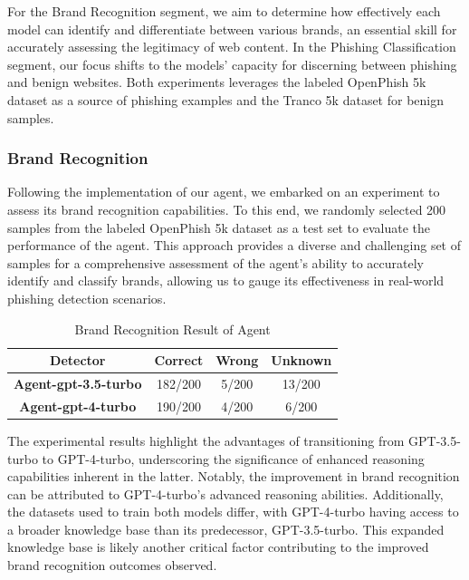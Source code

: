 For the Brand Recognition segment, we aim to determine how effectively each model can identify and differentiate between various brands, an essential skill for accurately assessing the legitimacy of web content. In the Phishing Classification segment, our focus shifts to the models' capacity for discerning between phishing and benign websites. Both experiments leverages the labeled OpenPhish 5k dataset as a source of phishing examples and the Tranco 5k dataset for benign samples.\cite{li2024knowphish}

\subsubsection{Brand Recognition}

Following the implementation of our agent, we embarked on an experiment to assess its brand recognition capabilities. To this end, we randomly selected 200 samples from the labeled OpenPhish 5k dataset as a test set to evaluate the performance of the agent. This approach provides a diverse and challenging set of samples for a comprehensive assessment of the agent's ability to accurately identify and classify brands, allowing us to gauge its effectiveness in real-world phishing detection scenarios.

\begin{table}[h!]
    \centering
    \begin{tabular}{cccc}
     \textbf{Detector} & \textbf{Correct} & \textbf{Wrong} & \textbf{Unknown} \\
     \midrule
      \textbf{Agent-gpt-3.5-turbo}   & 182/200 & 5/200 & 13/200 \\
      \textbf{Agent-gpt-4-turbo}   & 190/200 & 4/200 & 6/200 \\
    \end{tabular}
    \caption{Brand Recognition Result of Agent}
    \label{tab:my_label}
\end{table}

The experimental results highlight the advantages of transitioning from GPT-3.5-turbo to GPT-4-turbo, underscoring the significance of enhanced reasoning capabilities inherent in the latter. Notably, the improvement in brand recognition can be attributed to GPT-4-turbo's advanced reasoning abilities. Additionally, the datasets used to train both models differ, with GPT-4-turbo having access to a broader knowledge base than its predecessor, GPT-3.5-turbo. This expanded knowledge base is likely another critical factor contributing to the improved brand recognition outcomes observed.

